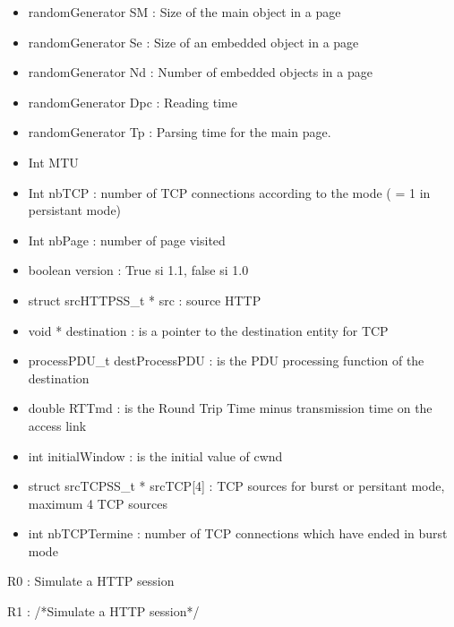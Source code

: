 \documentclass[a4paper]{article}
\begin{document}
\begin{itemize}
\item randomGenerator SM : Size of the main object in a page
\end{itemize}
\begin{itemize}
\item randomGenerator Se : Size of an embedded object in a page
\end{itemize}
\begin{itemize}
\item randomGenerator Nd : Number of embedded objects in a page
\end{itemize}
\begin{itemize}
\item randomGenerator Dpc : Reading time
\end{itemize}
\begin{itemize}
\item randomGenerator Tp : Parsing time for the main page.
\item Int MTU
\item Int nbTCP : number of TCP connections according to the mode ( = 1
in persistant mode)
\item Int nbPage : number of page visited
\item {
boolean version : True si 1.1, false si 1.0}
\item struct srcHTTPSS\_t * src : source HTTP
\item void * destination : is a pointer to the destination entity for
TCP
\item processPDU\_t destProcessPDU : is the PDU processing function of
the destination
\item double RTTmd : is the Round Trip Time minus transmission time on
the access link
\item int initialWindow : is the initial value of cwnd
\item {
struct srcTCPSS\_t * srcTCP[4] : TCP sources for burst or persitant
mode, maximum 4 TCP sources}
\item {
int nbTCPTermine : number of TCP connections which have ended in burst
mode}
\end{itemize}

\bigskip


\bigskip

{
R0 : Simulate a HTTP session}

{
R1 : /*\foreignlanguage{english}{Simulate a HTTP session*/}}
\end{document}
